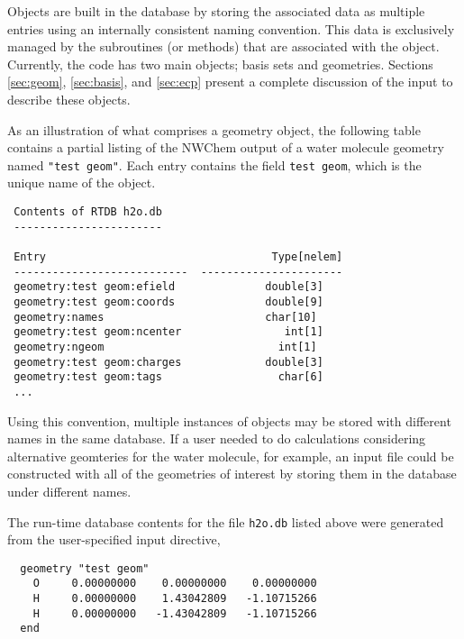 Objects are built in the database by storing the associated data as
multiple entries using an internally consistent naming convention.
This data is exclusively managed by the subroutines (or methods) that
are associated with the object.  Currently, the code has two main
objects; basis sets and geometries.  Sections \ref{sec:geom}, 
\ref{sec:basis}, and
\ref{sec:ecp} present a complete discussion of the input to describe
these objects.  

As an illustration of what comprises a geometry object, the following
table contains a partial listing of the NWChem output of a water molecule
geometry named \verb+"test geom"+.  Each entry contains the field 
\verb+test geom+, which is the unique name of the object.

\begin{verbatim}
 Contents of RTDB h2o.db
 -----------------------

 Entry                                   Type[nelem]
 ---------------------------  ----------------------
 geometry:test geom:efield              double[3]    
 geometry:test geom:coords              double[9]    
 geometry:names                         char[10]   
 geometry:test geom:ncenter                int[1]    
 geometry:ngeom                           int[1]    
 geometry:test geom:charges             double[3]    
 geometry:test geom:tags                  char[6]
 ...
\end{verbatim}

Using this convention, multiple instances of objects may be stored with
different names in the same database.  If a user needed to do calculations 
considering alternative geomteries
for the water molecule, for example, an input file could be constructed with 
all of the geometries of interest by storing them in the 
database under different names.  


The run-time database contents for the file \verb+h2o.db+ listed 
above were generated from the user-specified input directive,
\begin{verbatim}
  geometry "test geom"
    O     0.00000000    0.00000000    0.00000000
    H     0.00000000    1.43042809   -1.10715266
    H     0.00000000   -1.43042809   -1.10715266
  end
\end{verbatim}

